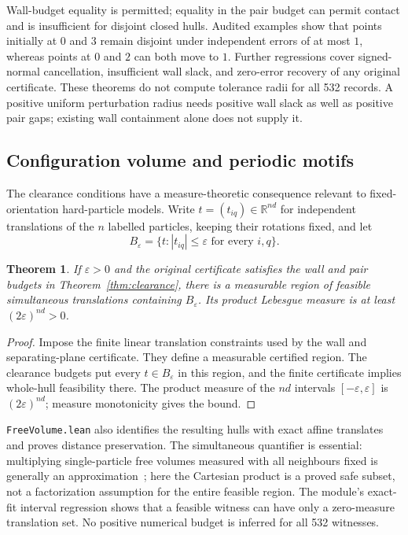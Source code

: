 \documentclass[11pt,a4paper]{article}
\newcommand{\R}{\mathbb R}
\newcommand{\code}[1]{\texttt{\nolinkurl{#1}}}
\newtheorem{theorem}{Theorem}
\begin{document}
Wall-budget equality is permitted; equality in the pair budget can permit
contact and is insufficient for disjoint closed hulls. Audited examples show
that points initially at $0$ and $3$ remain disjoint under independent errors
of at most $1$, whereas points at $0$ and $2$ can both move to $1$.
Further regressions cover signed-normal cancellation, insufficient wall slack,
and zero-error recovery of any original certificate. These theorems do not
compute tolerance radii for all 532 records. A positive uniform perturbation
radius needs positive wall slack as well as positive pair gaps; existing wall
containment alone does not supply it.

\subsection{Configuration volume and periodic motifs}\label{sec:materialsformal}
The clearance conditions have a measure-theoretic consequence relevant to
fixed-orientation hard-particle models. Write $t=(t_{iq})\in\R^{nd}$ for
independent translations of the $n$ labelled particles, keeping their rotations
fixed, and let
\[
B_\varepsilon=\{t:|t_{iq}|\leq\varepsilon\text{ for every }i,q\}.
\]
\begin{theorem}\label{thm:freevolume}
If $\varepsilon>0$ and the original certificate satisfies the wall and pair
budgets in Theorem~\ref{thm:clearance}, there is a measurable region of feasible
simultaneous translations containing $B_\varepsilon$. Its product Lebesgue
measure is at least $(2\varepsilon)^{nd}>0$.
\end{theorem}
\begin{proof}
Impose the finite linear translation constraints used by the wall and
separating-plane certificate. They define a measurable certified region.
The clearance budgets put every $t\in B_\varepsilon$ in this region, and the
finite certificate implies whole-hull feasibility there. The product measure of
the $nd$ intervals $[-\varepsilon,\varepsilon]$ is
$(2\varepsilon)^{nd}$; measure monotonicity gives the bound.
\end{proof}
\code{FreeVolume.lean} also identifies the resulting hulls with exact affine
translates and proves distance preservation. The simultaneous quantifier is
essential: multiplying single-particle free volumes measured with all neighbours
fixed is generally an approximation~\cite[Section II.D]{haji2011}; here the
Cartesian product is a proved safe subset, not a factorization assumption for
the entire feasible region. The module's exact-fit interval regression shows
that a feasible witness can have only a zero-measure translation set. No
positive numerical budget is inferred for all 532 witnesses.
\end{document}
